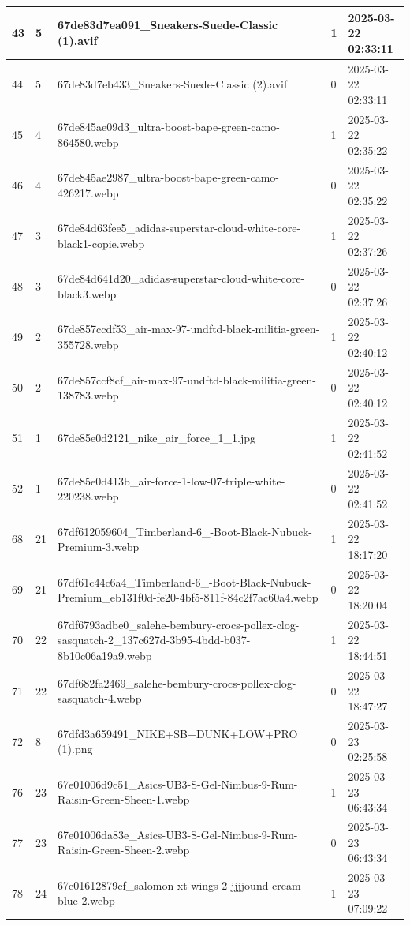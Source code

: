 \begin{longtable}{|l|l|l|l|l|}
43 & 5 & 67de83d7ea091\_Sneakers-Suede-Classic (1).avif & 1 & 2025-03-22 02:33:11 \\ \hline 
44 & 5 & 67de83d7eb433\_Sneakers-Suede-Classic (2).avif & 0 & 2025-03-22 02:33:11 \\ \hline 
45 & 4 & 67de845ae09d3\_ultra-boost-bape-green-camo-864580.webp & 1 & 2025-03-22 02:35:22 \\ \hline 
46 & 4 & 67de845ae2987\_ultra-boost-bape-green-camo-426217.webp & 0 & 2025-03-22 02:35:22 \\ \hline 
47 & 3 & 67de84d63fee5\_adidas-superstar-cloud-white-core-black1-copie.webp & 1 & 2025-03-22 02:37:26 \\ \hline 
48 & 3 & 67de84d641d20\_adidas-superstar-cloud-white-core-black3.webp & 0 & 2025-03-22 02:37:26 \\ \hline 
49 & 2 & 67de857ccdf53\_air-max-97-undftd-black-militia-green-355728.webp & 1 & 2025-03-22 02:40:12 \\ \hline 
50 & 2 & 67de857ccf8cf\_air-max-97-undftd-black-militia-green-138783.webp & 0 & 2025-03-22 02:40:12 \\ \hline 
51 & 1 & 67de85e0d2121\_nike\_air\_force\_1\_1.jpg & 1 & 2025-03-22 02:41:52 \\ \hline 
52 & 1 & 67de85e0d413b\_air-force-1-low-07-triple-white-220238.webp & 0 & 2025-03-22 02:41:52 \\ \hline 
68 & 21 & 67df612059604\_Timberland-6\_-Boot-Black-Nubuck-Premium-3.webp & 1 & 2025-03-22 18:17:20 \\ \hline 
69 & 21 & 67df61c44c6a4\_Timberland-6\_-Boot-Black-Nubuck-Premium\_eb131f0d-fe20-4bf5-811f-84c2f7ac60a4.webp & 0 & 2025-03-22 18:20:04 \\ \hline 
70 & 22 & 67df6793adbe0\_salehe-bembury-crocs-pollex-clog-sasquatch-2\_137c627d-3b95-4bdd-b037-8b10c06a19a9.webp & 1 & 2025-03-22 18:44:51 \\ \hline 
71 & 22 & 67df682fa2469\_salehe-bembury-crocs-pollex-clog-sasquatch-4.webp & 0 & 2025-03-22 18:47:27 \\ \hline 
72 & 8 & 67dfd3a659491\_NIKE+SB+DUNK+LOW+PRO (1).png & 0 & 2025-03-23 02:25:58 \\ \hline 
76 & 23 & 67e01006d9c51\_Asics-UB3-S-Gel-Nimbus-9-Rum-Raisin-Green-Sheen-1.webp & 1 & 2025-03-23 06:43:34 \\ \hline 
77 & 23 & 67e01006da83e\_Asics-UB3-S-Gel-Nimbus-9-Rum-Raisin-Green-Sheen-2.webp & 0 & 2025-03-23 06:43:34 \\ \hline 
78 & 24 & 67e01612879cf\_salomon-xt-wings-2-jjjjound-cream-blue-2.webp & 1 & 2025-03-23 07:09:22 \\ \hline 

\end{longtable}

